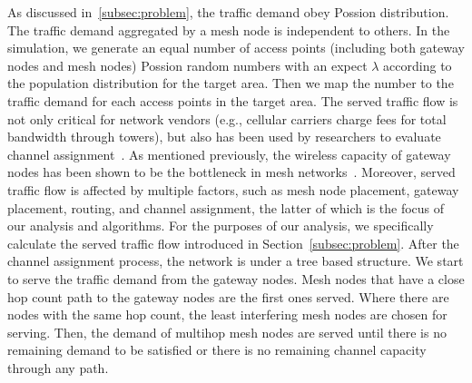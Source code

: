 As discussed in~\ref{subsec:problem}, the traffic demand obey Possion distribution. The traffic demand 
aggregated by a mesh node is independent to others. In the simulation, we generate an equal number of 
access points (including both gateway nodes and mesh nodes) Possion random numbers with an expect $\lambda$ 
according to the population distribution for the target area. Then we map the number to the traffic demand 
for each access points in the target area.
The served traffic flow is not only critical for network vendors (e.g., cellular carriers charge fees for 
total bandwidth through towers), but also has been used by researchers to evaluate channel assignment~\cite{avallone2008channel}. 
As mentioned previously, the wireless capacity of gateway nodes has been shown to be the bottleneck in mesh 
networks~\cite{robinson2010deploying}. Moreover, served traffic flow is affected by multiple factors, such 
as mesh node placement, gateway placement, routing, and channel assignment, the latter of which is the focus 
of our analysis and algorithms. For the purposes of our analysis, we specifically calculate the served traffic 
flow introduced in Section~\ref{subsec:problem}. After the channel assignment process, the network is under a 
tree based structure. We start to serve the traffic demand from the gateway nodes. Mesh nodes that have a close 
hop count path to the gateway nodes are the first ones served. Where there are nodes with the same hop count, 
the least interfering mesh nodes are chosen for serving. Then, the demand of multihop mesh nodes are served 
until there is no remaining demand to be satisfied or there is no remaining channel capacity through any path.

